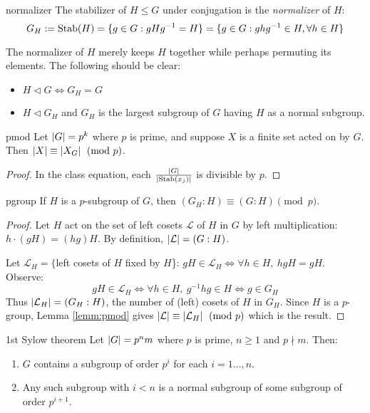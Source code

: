 \begin{defn}{}{normalizer}
	The stabilizer of $H\le G$ under conjugation is the \emph{normalizer} of $H$:
	\[
		G_H:=\operatorname{Stab}(H)=\{g\in G:gHg^{-1}=H\}
		=\{g\in G:gh g^{-1}\in H,\forall h\in H\}
	\]
\end{defn}


The normalizer of $H$ merely keeps $H$ together while perhaps permuting its elements. The following should be clear:
\begin{itemize}
  \item $H\triangleleft G\iff G_H=G$
  \item $H\triangleleft G_H$ and $G_H$ is the largest subgroup of $G$ having $H$ as a normal subgroup.
\end{itemize}


\begin{lemm}{}{pmod}
	Let $\left| G\right|=p^k$ where $p$ is prime, and suppose $X$ is a finite set acted on by $G$. Then $\left| X\right|\equiv\left| X_G\right|\pmod p$.
\end{lemm}

\begin{proof}
	In the class equation, each $\frac{\left| G\right|}{\left| \operatorname{Stab}(x_j)\right|}$ is divisible by $p$.
\end{proof}


\begin{lemm}{}{pgroup}
	If $H$ is a $p$-subgroup of $G$, then $(G_H:H)\equiv (G:H)\pmod p$.
\end{lemm}

\begin{proof}
	Let $H$ act on the set of left cosets $\mathcal L$ of $H$ in $G$ by left multiplication: $h\cdot(gH)=(hg)H$. By definition, $\left| \mathcal L\right|=(G:H)$.\par
	Let $\mathcal L_H=\{$left cosets of $H$ fixed by $H$\}: $gH\in\mathcal L_H\Longleftrightarrow \forall h\in H, \ hgH=gH$. Observe:
	\[
		gH\in\mathcal L_H\iff \forall h\in H,\ g^{-1}hg\in H\iff g\in G_H
	\]
	Thus $\left| \mathcal L_H\right|=(G_H:H)$, the number of (left) cosets of $H$ in $G_H$.\smallbreak
	Since $H$ is a $p$-group, Lemma \ref{lemm:pmod} gives $\left| \mathcal L\right|\equiv\left| \mathcal L_H\right|\pmod p$ which is the result.
\end{proof}


\goodbreak


\begin{thm}{1st Sylow theorem}{}
	Let $\left| G\right|=p^nm$ where $p$ is prime, $n\ge 1$ and $p\nmid m$. Then:
	\begin{enumerate}
		\item $G$ contains a subgroup of order $p^i$ for each $i=1\ldots,n$.
		\item Any such subgroup with $i<n$ is a normal subgroup of some subgroup of order $p^{i+1}$.
	\end{enumerate}
\end{thm}

